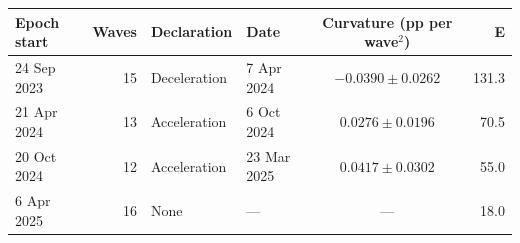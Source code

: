 \begin{tabular}{lrllcr}
\toprule
Epoch start & Waves & Declaration & Date & Curvature (pp per wave$^2$) & E \\
\midrule
24 Sep 2023 & 15 & Deceleration & 7 Apr 2024 & $-0.0390 \pm 0.0262$ & 131.3 \\
21 Apr 2024 & 13 & Acceleration & 6 Oct 2024 & $0.0276 \pm 0.0196$ & 70.5 \\
20 Oct 2024 & 12 & Acceleration & 23 Mar 2025 & $0.0417 \pm 0.0302$ & 55.0 \\
6 Apr 2025 & 16 & None & --- & --- & 18.0 \\
\bottomrule
\end{tabular}
